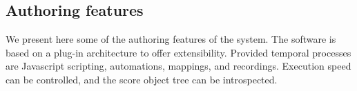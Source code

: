\documentclass{article}
\newcommand{\timeconstraint}{\textit{time constraint}\xspace}
\begin{document}
\subsection{Authoring features}
We present here some of the authoring features of the system. 
The software is based on a plug-in architecture to offer extensibility.
Provided temporal processes are Javascript scripting, automations, mappings, and 
recordings. 
Execution speed can be controlled, and the score object tree can be introspected.
%
%
%
\end{document}
